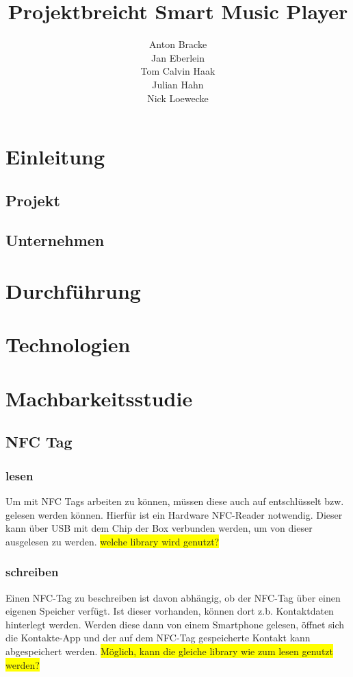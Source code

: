 \documentclass[10pt, a4paper, draft]{article}
\title{Projektbreicht Smart Music Player}
\author{Anton Bracke\\Jan Eberlein\\Tom Calvin Haak\\Julian Hahn\\Nick Loewecke}
\begin{document}
\maketitle
\tableofcontents

\section{Einleitung}
\subsection{Projekt}
\subsection{Unternehmen}

\section{Durchführung}

\section{Technologien}

\section{Machbarkeitsstudie}

\subsection{NFC Tag}
\subsubsection{lesen}
Um mit NFC Tags arbeiten zu können, müssen diese auch auf entschlüsselt bzw. gelesen werden können.
Hierfür ist ein Hardware NFC-Reader notwendig. Dieser kann über USB mit dem Chip der Box verbunden werden, um von dieser ausgelesen zu werden.
\colorbox{yellow}{welche library wird genutzt?}

\subsubsection{schreiben}
Einen NFC-Tag zu beschreiben ist davon abhängig, ob der NFC-Tag über einen eigenen Speicher verfügt.
Ist dieser vorhanden, können dort z.b. Kontaktdaten hinterlegt werden. Werden diese dann von einem Smartphone gelesen, öffnet sich die Kontakte-App und der auf dem NFC-Tag gespeicherte Kontakt kann abgespeichert werden.
\colorbox{yellow}{Möglich, kann die gleiche library wie zum lesen genutzt werden?}
\end{document}
